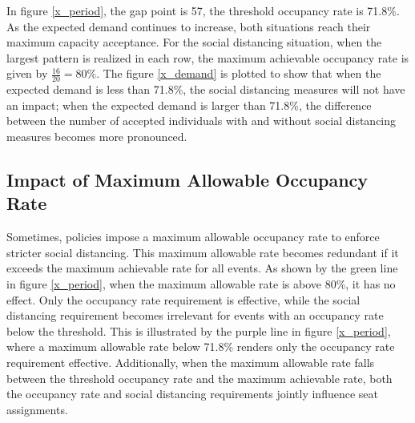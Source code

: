 In figure \ref{x_period}, the gap point is 57, the threshold occupancy rate is 71.8\%. As the expected demand continues to increase, both situations reach their maximum capacity acceptance. For the social distancing situation, when the largest pattern is realized in each row, the maximum achievable occupancy rate is given by $\frac{16}{20} = 80\%$. The figure \ref{x_demand} is plotted to show that when the expected demand is less than 71.8\%, the social distancing measures will not have an impact; when the expected demand is larger than 71.8\%, the difference between the number of accepted individuals with and without social distancing measures becomes more pronounced.

\subsection*{Impact of Maximum Allowable Occupancy Rate}
Sometimes, policies impose a maximum allowable occupancy rate to enforce stricter social distancing. This maximum allowable rate becomes redundant if it exceeds the maximum achievable rate for all events. As shown by the green line in figure \ref{x_period}, when the maximum allowable rate is above 80\%, it has no effect. Only the occupancy rate requirement is effective, while the social distancing requirement becomes irrelevant for events with an occupancy rate below the threshold. This is illustrated by the purple line in figure \ref{x_period}, where a maximum allowable rate below 71.8\% renders only the occupancy rate requirement effective. Additionally, when the maximum allowable rate falls between the threshold occupancy rate and the maximum achievable rate, both the occupancy rate and social distancing requirements jointly influence seat assignments.




